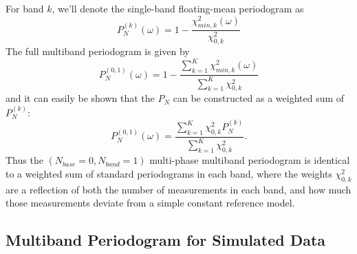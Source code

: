 \documentclass{emulateapj}
\newcommand{\sectlabel}[1]{\label{sect:#1}}
\begin{document}
For band $k$, we'll denote the single-band floating-mean periodogram as
\begin{equation}
  P_N^{(k)}(\omega) = 1 - \frac{\chi^2_{min, k}(\omega)}{\chi^2_{0,k}}
\end{equation}
The full multiband periodogram is given by
\begin{equation}
  P_N^{(0,1)}(\omega) = 1 - \frac{\sum_{k=1}^K\chi^2_{min, k}(\omega)}{\sum_{k=1}^K\chi^2_{0,k}}
\end{equation}
and it can easily be shown that the $P_N$ can be constructed as a weighted sum of $P_N^{(k)}$:
\begin{equation}
  P_N^{(0,1)}(\omega) = \frac{\sum_{k=1}^K\chi^2_{0,k}P_N^{(k)}}{\sum_{k=1}^K\chi^2_{0,k}}.
\end{equation}
Thus the $(N_{base}=0, N_{band}=1)$ multi-phase  multiband periodogram is identical to a weighted sum of standard periodograms in each band, where the weights $\chi^2_{0,k}$ are a reflection of both the number of measurements in each band, and how much those measurements deviate from a simple constant reference model.

\subsection{Multiband Periodogram for Simulated Data}
\sectlabel{Simulated}
\end{document}
